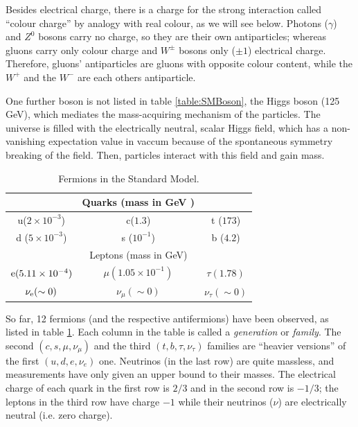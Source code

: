 \documentclass[a4paper,12pt]{article}
\begin{document}
Besides electrical charge, there is a charge for the strong interaction called ``colour charge'' by analogy with real colour, as we will see below. Photons ($\gamma$) and $Z^0$ bosons carry no charge, so they are their own antiparticles; whereas gluons carry only colour charge and $W^\pm$ bosons only ($\pm1$) electrical charge. Therefore, gluons' antiparticles are gluons with opposite colour content, while the $W^+$ and the $W^-$ are each others antiparticle.

One further boson is not listed in table \ref{table:SMBoson}, the Higgs boson (125 GeV), which mediates the mass-acquiring mechanism of the particles. The universe is filled with the electrically neutral, scalar Higgs field, which has a non-vanishing expectation value in vaccum because of the spontaneous symmetry breaking of the field. Then, particles interact with this field and gain mass.

\begin{table}[!h]
\caption{Fermions in the Standard Model.}\smallskip
\label{table:SMFerm}
\centering 

\begin{tabular}{ccc}
\hline \hline  
\smallskip
&Quarks (mass in GeV \cite{Beringer:1900zz})\\ 
\hline
u($2\times 10^{-3}$) & c($1.3$) & t ($173$) \\
d ($5\times 10^{-3}$) & s ($10^{-1}$) & b ($4.2$)\\
\hline \hline
\smallskip
&Leptons (mass in GeV) \\
\hline
\smallskip
${\mathrm e} (5.11 \times 10^{-4})$ & $\mu(1.05 \times 10^{-1})$ & $\tau(1.78)$ \\
$\nu_{\mathrm e} (\sim 0)$ & $\nu_{\mu}(\sim 0)$ & $\nu_{\tau}(\sim 0)$\\
\end{tabular}
\end{table}

So far, 12 fermions (and the respective antifermions) have been observed, as listed in table \ref{table:SMFerm}. Each column in the table is called a \textit{generation} or \textit{family}. The second $(c,s,\mu,\nu_{\mu})$ and the third $(t,b,\tau,\nu_{\tau})$ families are ``heavier versions'' of the first $(u,d,e,\nu_{e})$ one. Neutrinos (in the last row) are quite massless, and  measurements have only given an upper bound to their masses.  The electrical charge of each quark in the first row is $2/3$ and in the second row is $-1/3$; the leptons in the third row have charge $-1$ while their neutrinos ($\nu$) are electrically neutral (i.e. zero charge).
\end{document}
